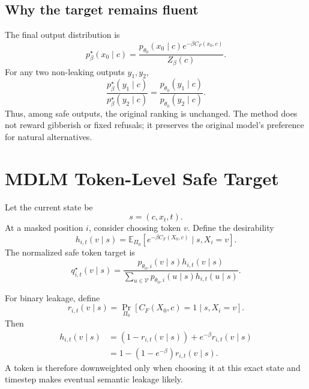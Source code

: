 \documentclass[10pt]{article}
\newcommand{\E}{\mathbb{E}}
\newcommand{\V}{\mathcal{V}}
\newcommand{\1}{\mathbb{I}}
\begin{document}
\subsection{Why the target remains fluent}

The final output distribution is
\begin{equation}
p_\beta^\star(x_0\mid c)
=
\frac{p_{\theta_0}(x_0\mid c)e^{-\beta C_F(x_0,c)}}{Z_\beta(c)}.
\end{equation}
For any two non-leaking outputs $y_1,y_2$,
\begin{equation}
\frac{p_\beta^\star(y_1\mid c)}{p_\beta^\star(y_2\mid c)}
=
\frac{p_{\theta_0}(y_1\mid c)}{p_{\theta_0}(y_2\mid c)}.
\label{eq:nonleak_odds}
\end{equation}
Thus, among safe outputs, the original ranking is unchanged. The method does not reward gibberish or fixed refusals; it preserves the original model's preference for natural alternatives.

\section{MDLM Token-Level Safe Target}

Let the current state be
\begin{equation}
s=(c,x_t,t).
\end{equation}
At a masked position $i$, consider choosing token $v$. Define the desirability
\begin{equation}
h_{i,t}(v\mid s)
=
\E_{\Pi_0}
\left[
 e^{-\beta C_F(X_0,c)}
 \mid s, X_i=v
\right].
\label{eq:desirability}
\end{equation}
The normalized safe token target is
\begin{equation}
q_{i,t}^\star(v\mid s)
=
\frac{
 p_{\theta_0,i}(v\mid s)h_{i,t}(v\mid s)
}{
 \sum_{u\in\V}p_{\theta_0,i}(u\mid s)h_{i,t}(u\mid s)
}.
\label{eq:safe_target}
\end{equation}

For binary leakage, define
\begin{equation}
r_{i,t}(v\mid s)
=
\Pr_{\Pi_0}
\left[
C_F(X_0,c)=1\mid s,X_i=v
\right].
\end{equation}
Then
\begin{align}
h_{i,t}(v\mid s)
&=(1-r_{i,t}(v\mid s))+e^{-\beta}r_{i,t}(v\mid s)\\
&=1-(1-e^{-\beta})r_{i,t}(v\mid s).
\label{eq:h_binary}
\end{align}
A token is therefore downweighted only when choosing it at this exact state and timestep makes eventual semantic leakage likely.
\end{document}

